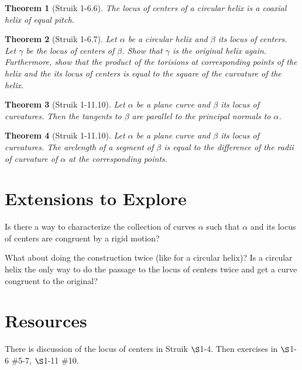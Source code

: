 \documentclass[11pt]{amsart}
\theoremstyle{plain}
\newtheorem*{theorem}{Theorem}
\begin{document}
\begin{theorem} [Struik 1-6.6]
The locus of centers of a circular helix is a coaxial helix of equal pitch.
\end{theorem}

\begin{theorem} [Struik 1-6.7]
Let $\alpha$ be a circular helix and $\beta$ its locus of centers. Let $\gamma$ be the locus of centers of $\beta$. Show that $\gamma$ is the original helix again. Furthermore, show that the product of the torisions at corresponding points of the helix and the its locus of centers is equal to the square of the curvature of the helix.
\end{theorem}

\begin{theorem} [Struik 1-11.10]
Let $\alpha$ be a plane curve and $\beta$ its locus of curvatures. Then the tangents to $\beta$ are parallel to the principal normals to $\alpha$.
\end{theorem}

\begin{theorem} [Struik 1-11.10]
Let $\alpha$ be a plane curve and $\beta$ its locus of curvatures. The arclength of a segment of $\beta$ is equal to the difference of the radii of curvature of $\alpha$ at the corresponding points.
\end{theorem}

\section*{Extensions to Explore}

Is there a way to characterize the collection of curves $\alpha$ such that $\alpha$ and its locus of centers are congruent by a rigid motion?

What about doing the construction twice (like for a circular helix)? Is a circular helix the only way to do the passage to the locus of centers twice and get a curve congruent to the original?

\section*{Resources}

There is discussion of the locus of centers in Struik $\S$1-4. Then exercises in $\S$1-6 \#5-7, $\S$1-11 \#10.
\end{document}
